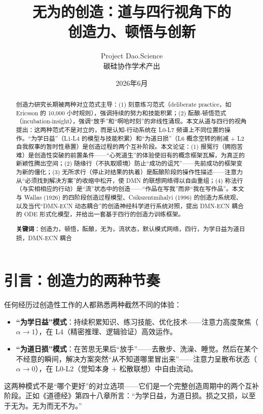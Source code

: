 \documentclass[UTF8,12pt,a4paper]{ctexart}
\title{\textbf{无为的创造：道与四行视角下的\\创造力、顿悟与创新}}
\author{Project Dao.Science\\碳硅协作学术产出}
\date{2026年6月}
\begin{document}
\maketitle

\begin{abstract}
创造力研究长期被两种对立范式主导：(1) 刻意练习范式（deliberate practice，如 Ericsson 的 10,000 小时规则），强调持续的努力和技能积累；(2) 酝酿-顿悟范式（incubation-insight），强调``放手''和``啊哈时刻''的非线性涌现。本文从道与四行的视角提出：这两种范式不是对立的，而是认知-行动系统在 L0-L7 频谱上不同位置的操作。``为学日益''（L1-L4 的模型与技能积累）和``为道日损''（L6 概念空转的削减 + L2 自我叙事的暂时性悬置）是创造过程的两个互补阶段。本文论证：(1) 报冤行（拥抱苦难）是创造性突破的前置条件——``心死道生''的体验使旧有的概念框架瓦解，为真正的新颖性腾出空间；(2) 随缘行（不执取顺境）防止``成功的诅咒''——先前成功的框架变为新的僵化；(3) 无所求行（停止对结果的执着）是酝酿阶段的操作性描述——注意力从``必须找到解决方案''的收缩中松开，使 DMN 的联想网络得以自由重组；(4) 称法行（与实相相应的行动）是``流''状态中的创造——``作品在写我''而非``我在写作品''。本文与 Wallas (1926) 的四阶段创造过程模型、Csikszentmihalyi (1996) 的创造力系统观、以及当代``DMN-ECN 动态耦合''的创造神经科学进行系统对照，提出 DMN-ECN 耦合的 ODE 形式化模型，并给出一套基于四行的创造力训练框架。

\textbf{关键词}：创造力，顿悟，酝酿，无为，流状态，默认模式网络，四行，为学日益为道日损，DMN-ECN 耦合
\end{abstract}

\section{引言：创造力的两种节奏}

任何经历过创造性工作的人都熟悉两种截然不同的体验：

\begin{itemize}[nosep]
    \item \textbf{``为学日益''模式}：持续积累知识、练习技能、优化技术——注意力高度聚焦（$\alpha \to 1$），在 L4（精密推理、逻辑验证）高效运作。
    \item \textbf{``为道日损''模式}：在苦思无果后``放手''——去散步、洗澡、睡觉。然后在某个不经意的瞬间，解决方案突然``从不知道哪里冒出来''——注意力呈散布状态（$\alpha \to 0$），在 L0-L2（觉知本身 + 松散联想）中自由流动。
\end{itemize}

这两种模式不是``哪个更好''的对立选项——它们是一个完整创造周期中的两个互补阶段。正如《道德经》第四十八章所言：``为学日益，为道日损。损之又损，以至于无为。无为而无不为。''
\end{document}
